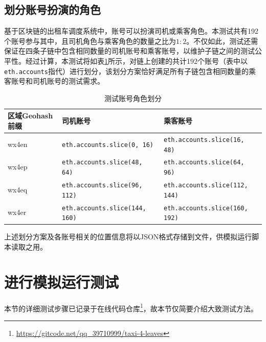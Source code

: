 \subsection{划分账号扮演的角色}

基于区块链的出租车调度系统中，账号可以扮演司机或乘客角色。本测试共有192个账号参与其中，且司机角色与乘客角色的数量之比为$1:2$。不仅如此，测试还需保证在四条子链中包含相同数量的司机账号和乘客账号，以维护子链之间的测试公平性。经过计算，本测试将如表\ref{测试账号角色划分}所示，对链上创建的共计192个账号（表中以\verb|eth.accounts|指代）进行划分，该划分方案恰好满足所有子链包含相同数量的乘客账号和司机账号的测试需求。

\begin{table}[htbp]
    \linespread{1.5}
    \centering
    \caption{测试账号角色划分}\label{测试账号角色划分}
    \begin{tabular}{l|l|l} \toprule
        区域Geohash前缀 & 司机账号                                & 乘客账号                                \\\hline
        wx4en       & \verb|eth.accounts.slice(0, 16)|    & \verb|eth.accounts.slice(16, 48)|   \\
        wx4ep       & \verb|eth.accounts.slice(48, 64)|   & \verb|eth.accounts.slice(64, 96)|   \\
        wx4eq       & \verb|eth.accounts.slice(96, 112)|  & \verb|eth.accounts.slice(112, 144)| \\
        wx4er       & \verb|eth.accounts.slice(144, 160)| & \verb|eth.accounts.slice(160, 192)| \\
        \bottomrule
    \end{tabular}
\end{table}

上述划分方案及各账号相关的位置信息将以JSON格式存储到文件，供模拟运行脚本读取之用。

\section{进行模拟运行测试}

本节的详细测试步骤已记录于在线代码仓库\footnote{\url{https://gitcode.net/qq_39710999/taxi-4-leaves}}，故本节仅简要介绍大致测试方法。

